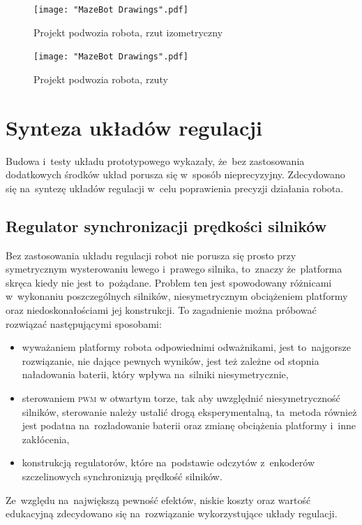 \documentclass[11pt]{article}
\begin{document}
\begin{figure}
		\centering
		\texttt{[image: "MazeBot Drawings".pdf]}
		\caption{Projekt podwozia robota, rzut izometryczny}
		\label{fig:cad_izo}
\end{figure}

\begin{figure}
		\centering
		\texttt{[image: "MazeBot Drawings".pdf]}
		\caption{Projekt podwozia robota, rzuty}
		\label{fig:cad_multi}
\end{figure}

\section{Synteza układów regulacji}
Budowa i~testy układu prototypowego wykazały, że~bez zastosowania dodatkowych środków układ porusza się w~sposób nieprecyzyjny.
Zdecydowano się na~syntezę układów regulacji w~celu poprawienia precyzji działania robota.
\subsection{Regulator synchronizacji prędkości silników}
Bez zastosowania układu regulacji robot nie porusza się prosto przy symetrycznym wysterowaniu lewego i~prawego silnika, to~znaczy że~platforma skręca kiedy nie jest to~pożądane.
Problem ten jest spowodowany różnicami w~wykonaniu poszczególnych silników, niesymetrycznym obciążeniem platformy oraz niedoskonałościami jej konstrukcji.
To zagadnienie można próbować rozwiązać następującymi sposobami:
\begin{itemize}
	\item wyważaniem platformy robota odpowiednimi odważnikami, jest to~najgorsze rozwiązanie, nie dające pewnych wyników, jest też zależne od stopnia naładowania baterii, który wpływa na~silniki niesymetrycznie,
	\item sterowaniem \textsc{pwm} w otwartym torze, tak aby uwzględnić niesymetryczność silników, sterowanie należy ustalić drogą eksperymentalną, ta~metoda również jest podatna na~rozładowanie baterii oraz zmianę obciążenia platformy i~inne zakłócenia,
	\item konstrukcją regulatorów, które na~podstawie odczytów z~enkoderów szczelinowych synchronizują prędkość silników.
\end{itemize}
Ze~względu na~największą pewność efektów, niskie koszty oraz wartość edukacyjną zdecydowano się na~rozwiązanie wykorzystujące układy regulacji.
\end{document}
